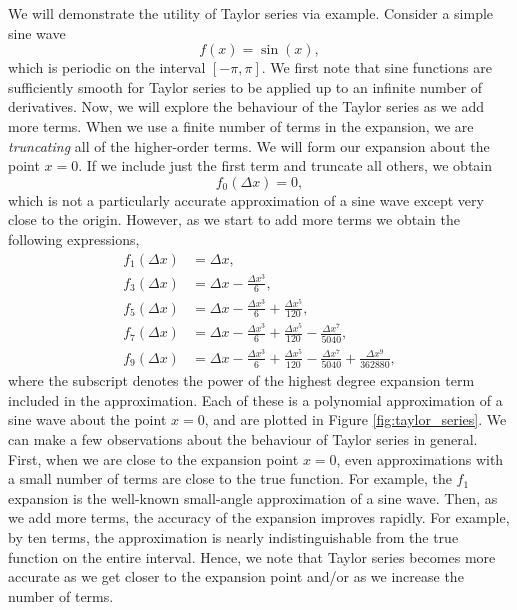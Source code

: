 We will demonstrate the utility of Taylor series via example. Consider a simple sine wave 
\begin{equation}
	f(x) = \sin(x),
\end{equation}
which is periodic on the interval $[- \pi, \pi]$. We first note that sine functions are sufficiently smooth for Taylor series to be applied up to an infinite number of derivatives. Now, we will explore the behaviour of the Taylor series as we add more terms. When we use a finite number of terms in the expansion, we are {\it truncating} all of the higher-order terms. We will form our expansion about the point $x = 0$. If we include just the first term and truncate all others, we obtain
\begin{equation}
	f_0(\Delta x) = 0,
\end{equation}
which is not a particularly accurate approximation of a sine wave except very close to the origin. However, as we start to add more terms we obtain the following expressions,
\begin{align}
	f_1(\Delta x) &= \Delta x,\\
	f_3(\Delta x) &= \Delta x - \frac{\Delta x^3}{6},\\
	f_5(\Delta x) &= \Delta x - \frac{\Delta x^3}{6} + \frac{\Delta x^5}{120},\\
	f_7(\Delta x) &= \Delta x - \frac{\Delta x^3}{6} + \frac{\Delta x^5}{120} - \frac{\Delta x^7}{5040},\\
	f_{9}(\Delta x) &= \Delta x - \frac{\Delta x^3}{6} + \frac{\Delta x^5}{120} - \frac{\Delta x^7}{5040} + \frac{\Delta x^9}{362880},
\end{align}
where the subscript denotes the power of the highest degree expansion term included in the approximation. Each of these is a polynomial approximation of a sine wave about the point $x=0$, and are plotted in Figure \ref{fig:taylor_series}. We can make a few observations about the behaviour of Taylor series in general. First, when we are close to the expansion point $x=0$, even approximations with a small number of terms are close to the true function. For example, the $f_1$ expansion is the well-known small-angle approximation of a sine wave. Then, as we add more terms, the accuracy of the expansion improves rapidly. For example, by ten terms, the approximation is nearly indistinguishable from the true function on the entire interval. Hence, we note that Taylor series becomes more accurate as we get closer to the expansion point and/or as we increase the number of terms.
